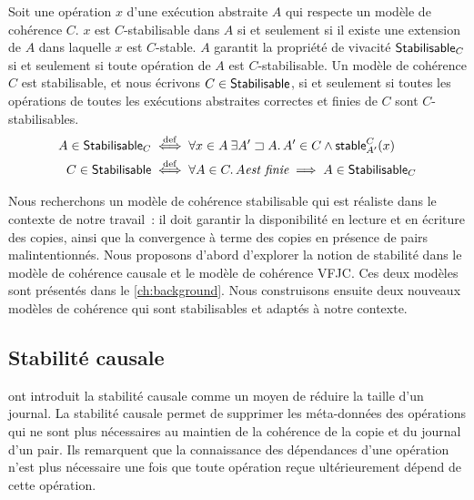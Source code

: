 \begin{definition}\label{def:stabilisable}
Soit une opération $x$ d'une exécution abstraite $A$ qui respecte un modèle de cohérence $C$.
$x$ est $C$-stabilisable dans $A$ si et seulement si il existe une extension de $A$ dans laquelle $x$ est $C$-stable.
$A$ garantit la propriété de vivacité $\operatorname{\mathsf{Stabilisable}}_C$ si et seulement si toute opération de $A$ est $C$-stabilisable.
Un modèle de cohérence $C$ est stabilisable, et nous écrivons $C \in \operatorname{\mathsf{Stabilisable}}$, si et seulement si toutes les opérations de toutes les exécutions abstraites correctes et finies de $C$ sont $C$-stabilisables.
\begin{align*}
    A \in \operatorname{\mathsf{Stabilisable}}_C &\overset{\mathrm{def}}{\iff} \forall x \in A \:\exists A' \sqsupset A \ldotp A' \in C \land \operatorname{\mathsf{stable}}_{A'}^C(x)\\
    C \in \operatorname{\mathsf{Stabilisable}} &\overset{\mathrm{def}}{\iff} \forall A \in C \ldotp A \textit{est finie} \implies A \in \operatorname{\mathsf{Stabilisable}}_C
\end{align*}
\end{definition}

Nous recherchons un modèle de cohérence stabilisable qui est réaliste dans le contexte de notre travail~: il doit garantir la disponibilité en lecture et en écriture des copies, ainsi que la convergence à terme des copies en présence de pairs malintentionnés.
Nous proposons d'abord d'explorer la notion de stabilité dans le modèle de cohérence causale et le modèle de cohérence \acl{VFJC}.
Ces deux modèles sont présentés dans le \autoref{ch:background}.
Nous construisons ensuite deux nouveaux modèles de cohérence qui sont stabilisables et adaptés à notre contexte.


\clearpage %

\subsection{Stabilité causale}\label{subsec:cs}

\textcite{baquero_2018_pure-op-crdt} ont introduit la stabilité causale comme un moyen de réduire la taille d'un journal.
La stabilité causale permet de supprimer les méta-données des opérations qui ne sont plus nécessaires au maintien de la cohérence de la copie et du journal d'un pair.
Ils remarquent que la connaissance des dépendances d'une opération n'est plus nécessaire une fois que toute opération reçue ultérieurement dépend de cette opération.

